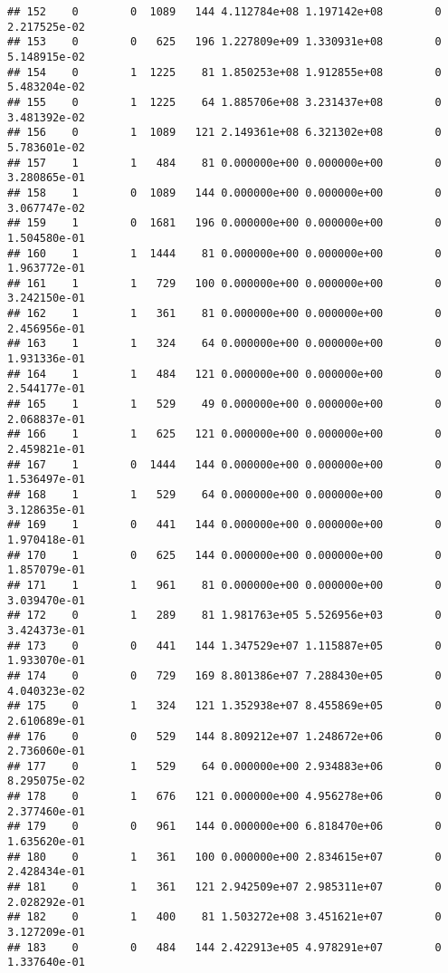 \documentclass[
]{article}
\begin{document}
\begin{enumerate}
\begin{verbatim}
## 152    0        0  1089   144 4.112784e+08 1.197142e+08        0  2.217525e-02
## 153    0        0   625   196 1.227809e+09 1.330931e+08        0  5.148915e-02
## 154    0        1  1225    81 1.850253e+08 1.912855e+08        0  5.483204e-02
## 155    0        1  1225    64 1.885706e+08 3.231437e+08        0  3.481392e-02
## 156    0        1  1089   121 2.149361e+08 6.321302e+08        0  5.783601e-02
## 157    1        1   484    81 0.000000e+00 0.000000e+00        0  3.280865e-01
## 158    1        0  1089   144 0.000000e+00 0.000000e+00        0  3.067747e-02
## 159    1        0  1681   196 0.000000e+00 0.000000e+00        0  1.504580e-01
## 160    1        1  1444    81 0.000000e+00 0.000000e+00        0  1.963772e-01
## 161    1        1   729   100 0.000000e+00 0.000000e+00        0  3.242150e-01
## 162    1        1   361    81 0.000000e+00 0.000000e+00        0  2.456956e-01
## 163    1        1   324    64 0.000000e+00 0.000000e+00        0  1.931336e-01
## 164    1        1   484   121 0.000000e+00 0.000000e+00        0  2.544177e-01
## 165    1        1   529    49 0.000000e+00 0.000000e+00        0  2.068837e-01
## 166    1        1   625   121 0.000000e+00 0.000000e+00        0  2.459821e-01
## 167    1        0  1444   144 0.000000e+00 0.000000e+00        0  1.536497e-01
## 168    1        1   529    64 0.000000e+00 0.000000e+00        0  3.128635e-01
## 169    1        0   441   144 0.000000e+00 0.000000e+00        0  1.970418e-01
## 170    1        0   625   144 0.000000e+00 0.000000e+00        0  1.857079e-01
## 171    1        1   961    81 0.000000e+00 0.000000e+00        0  3.039470e-01
## 172    0        1   289    81 1.981763e+05 5.526956e+03        0  3.424373e-01
## 173    0        0   441   144 1.347529e+07 1.115887e+05        0  1.933070e-01
## 174    0        0   729   169 8.801386e+07 7.288430e+05        0  4.040323e-02
## 175    0        1   324   121 1.352938e+07 8.455869e+05        0  2.610689e-01
## 176    0        0   529   144 8.809212e+07 1.248672e+06        0  2.736060e-01
## 177    0        1   529    64 0.000000e+00 2.934883e+06        0  8.295075e-02
## 178    0        1   676   121 0.000000e+00 4.956278e+06        0  2.377460e-01
## 179    0        0   961   144 0.000000e+00 6.818470e+06        0  1.635620e-01
## 180    0        1   361   100 0.000000e+00 2.834615e+07        0  2.428434e-01
## 181    0        1   361   121 2.942509e+07 2.985311e+07        0  2.028292e-01
## 182    0        1   400    81 1.503272e+08 3.451621e+07        0  3.127209e-01
## 183    0        0   484   144 2.422913e+05 4.978291e+07        0  1.337640e-01

\end{verbatim}
\end{enumerate}
\end{document}
